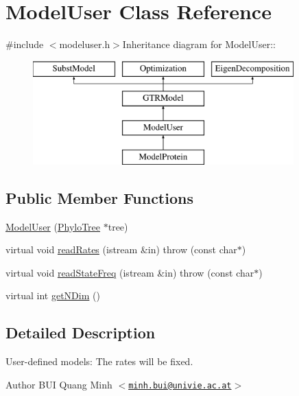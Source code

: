 \hypertarget{classModelUser}{
\section{ModelUser Class Reference}
\label{classModelUser}
}


{\ttfamily \#include $<$modeluser.h$>$}Inheritance diagram for ModelUser::\begin{figure}[H]
\begin{center}
\leavevmode
\includegraphics[height=4cm]{classModelUser}
\end{center}
\end{figure}
\subsection*{Public Member Functions}
\begin{DoxyCompactItemize}
\item 
\hyperlink{classModelUser_a69fd20f8460e71c0d2e3f7b0daf015c3}{ModelUser} (\hyperlink{classPhyloTree}{PhyloTree} $\ast$tree)
\item 
virtual void \hyperlink{classModelUser_ae0aedeb30d43fbcffcaf5da4bbef5c06}{readRates} (istream \&in)  throw (const char$\ast$)
\item 
virtual void \hyperlink{classModelUser_a9f0085e7db330321824bf0ccce250bd5}{readStateFreq} (istream \&in)  throw (const char$\ast$)
\item 
virtual int \hyperlink{classModelUser_ad5a88a6c25475b8bb0ea778f4c40cf3b}{getNDim} ()
\end{DoxyCompactItemize}


\subsection{Detailed Description}
User-\/defined models: The rates will be fixed.

\begin{DoxyAuthor}{Author}
BUI Quang Minh $<$\href{mailto:minh.bui@univie.ac.at}{\tt minh.bui@univie.ac.at}$>$ 
\end{DoxyAuthor}


